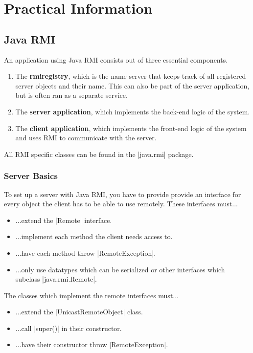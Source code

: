 \documentclass[a4paper]{article}
\begin{document}
\newpage

\section{Practical Information}

\subsection{Java RMI}

An application using Java RMI consists out of three essential components.

\begin{enumerate}
\item The \textbf{rmiregistry}, which is the name server that keeps track of all registered server objects and their name. This can also be part of the server application, but is often ran as a separate service.
\item The \textbf{server application}, which implements the back-end logic of the system.
\item The \textbf{client application}, which implements the front-end logic of the system and uses RMI to communicate with the server.
\end{enumerate}

All RMI specific classes can be found in the |java.rmi| package.

\subsubsection{Server Basics}

To set up a server with Java RMI, you have to provide provide an interface for every object the client has to be able to use remotely. These interfaces must...

\begin{itemize}
\item ...extend the |Remote| interface.
\item ...implement each method the client needs access to.
\item ...have each method throw |RemoteException|.
\item ...only use datatypes which can be serialized or other interfaces which subclass |java.rmi.Remote|.
\end{itemize}

The classes which implement the remote interfaces must...

\begin{itemize}
\item ...extend the |UnicastRemoteObject| class.
\item ...call |super()| in their constructor.
\item ...have their constructor throw |RemoteException|.
\end{itemize}
\end{document}
